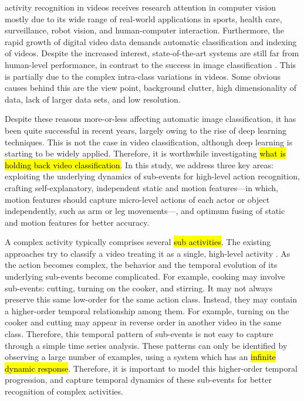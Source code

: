
 activity recognition in videos receives research attention
in computer vision mostly due to its wide range of real-world applications in
sports, health care, surveillance, robot vision, and human-computer interaction.
Furthermore, the rapid growth of digital video data demands automatic
classification and indexing of videos. Despite the increased interest, state-of-the-art
systems are still far from human-level performance, in contrast to the success in image classification \cite{girshick2014rich, krizhevsky2012imagenet}. This is partially due to the complex intra-class variations in videos. Some
obvious causes behind this are the view point, background
clutter, high dimensionality of data, lack of larger data sets, and low resolution.

Despite these reasons more-or-less affecting automatic image classification, it has been quite successful in recent years,
largely owing to the rise of deep learning techniques. This is not the case in video classification, although deep learning is
starting to be widely applied. Therefore, it is worthwhile investigating
\hl{what is holding back video classification}. In this study, we address three key
areas: exploiting the underlying dynamics of sub-events for high-level action recognition, crafting
self-explanatory, independent static and motion features---in which, motion features should capture micro-level actions
of each actor or object independently, such as arm or leg movements---, and optimum fusing of static and motion features for better accuracy.

A complex activity typically comprises several \hl{sub activities}.
The existing approaches try to classify a video treating it as a
single, high-level activity \cite{wang2011action, wang2013action, simonyan2014two, 7486474}.
As the action becomes complex, the behavior and the
temporal evolution of its underlying sub-events become complicated. For example,
cooking may involve sub-events: cutting, turning on the cooker, and stirring. It may not always preserve this
same low-order for the same action class. Instead, they may contain
a higher-order temporal relationship among them. For example, turning on the cooker and cutting
may appear in reverse order in another video in the same class.
Therefore, this temporal pattern of sub-events is not easy to capture through a simple
time series analysis. These patterns can only be identified by observing a large number
of examples, using a system which has an \hl{infinite dynamic response}. Therefore, it is important to
model this higher-order temporal
progression, and capture temporal dynamics of these sub-events for better recognition of
complex activities.

